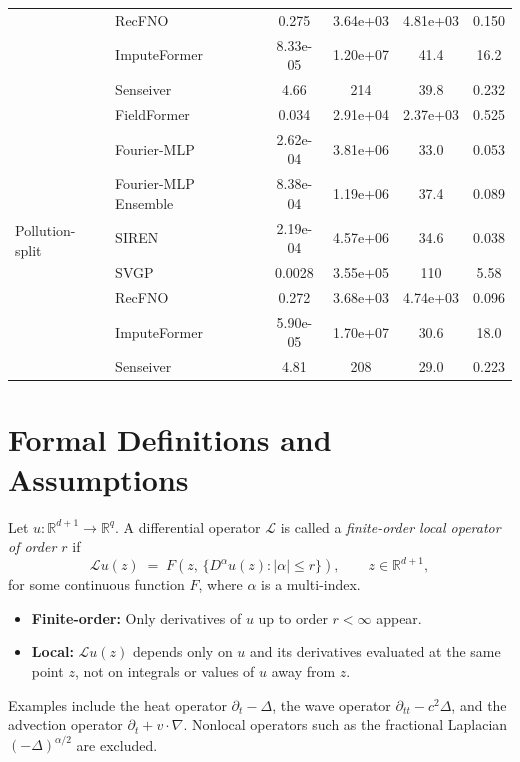 \begin{table}[htbp]
{\begin{tabular}{llcccc}
& RecFNO & 0.275 & 3.64e+03 & 4.81e+03 & 0.150 \\
& ImputeFormer & 8.33e-05 & 1.20e+07 & 41.4 & 16.2 \\
& Senseiver & 4.66 & 214 & 39.8 & 0.232 \\
\midrule
\multirow{8}{*}{Pollution-split}
& FieldFormer & 0.034 & 2.91e+04 & 2.37e+03 & 0.525 \\
& Fourier-MLP & 2.62e-04 & 3.81e+06 & 33.0 & 0.053 \\
& Fourier-MLP Ensemble & 8.38e-04 & 1.19e+06 & 37.4 & 0.089 \\
& SIREN & 2.19e-04 & 4.57e+06 & 34.6 & 0.038 \\
& SVGP & 0.0028 & 3.55e+05 & 110 & 5.58 \\
& RecFNO & 0.272 & 3.68e+03 & 4.74e+03 & 0.096 \\
& ImputeFormer & 5.90e-05 & 1.70e+07 & 30.6 & 18.0 \\
& Senseiver & 4.81 & 208 & 29.0 & 0.223 \\
\bottomrule
\end{tabular}%
}
\end{table}

\section{Formal Definitions and Assumptions}
\label{sec:definitions}
\begin{definition}
\label{def:local_operator}
Let $u:\mathbb{R}^{d+1}\to\mathbb{R}^q$.
A differential operator $\mathcal{L}$ is called a \emph{finite-order local operator of order $r$} if
\[
\mathcal{L}u(z) \;=\; F\!\left(z,\, \{D^\alpha u(z) : |\alpha|\le r\}\right),
\qquad z\in\mathbb{R}^{d+1},
\]
for some continuous function $F$, where $\alpha$ is a multi-index.  

\begin{itemize}[topsep=0pt,leftmargin=*]
    \item \textbf{Finite-order:} Only derivatives of $u$ up to order $r<\infty$ appear.
    \item \textbf{Local:} $\mathcal{L}u(z)$ depends only on $u$ and its derivatives evaluated at the same point $z$, not on integrals or values of $u$ away from $z$.
\end{itemize}

\noindent Examples include the heat operator $\partial_t - \Delta$, the wave operator $\partial_{tt}-c^2\Delta$, and the advection operator $\partial_t+v\cdot\nabla$.  
Nonlocal operators such as the fractional Laplacian $(-\Delta)^{\alpha/2}$ are excluded.
\end{definition}

